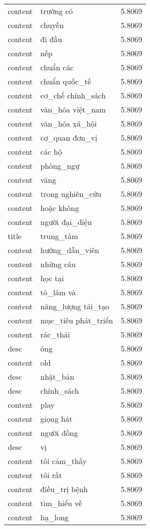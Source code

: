 \documentclass{article}
\begin{document}
\begin{tabular}{lll}
content & trường có & 5.8069\\
content & chuyền & 5.8069\\
content & đi đầu & 5.8069\\
content & nếp & 5.8069\\
content & chuẩn các & 5.8069\\
content & chuẩn quốc\_tế & 5.8069\\
content & cơ\_chế chính\_sách & 5.8069\\
content & văn\_hóa việt\_nam & 5.8069\\
content & văn\_hóa xã\_hội & 5.8069\\
content & cơ\_quan đơn\_vị & 5.8069\\
content & các hộ & 5.8069\\
content & phòng\_ngự & 5.8069\\
content & văng & 5.8069\\
content & trong nghiên\_cứu & 5.8069\\
content & hoặc không & 5.8069\\
content & người đại\_diện & 5.8069\\
title & trung\_tâm & 5.8069\\
content & hướng\_dẫn\_viên & 5.8069\\
content & những câu & 5.8069\\
content & học tại & 5.8069\\
content & tô\_lâm và & 5.8069\\
content & năng\_lượng tái\_tạo & 5.8069\\
content & mục\_tiêu phát\_triển & 5.8069\\
content & rác\_thải & 5.8069\\
desc & ông & 5.8069\\
content & old & 5.8069\\
desc & nhật\_bản & 5.8069\\
desc & chính\_sách & 5.8069\\
content & play & 5.8069\\
content & giọng hát & 5.8069\\
content & người đồng & 5.8069\\
desc & vị & 5.8069\\
content & tôi cảm\_thấy & 5.8069\\
content & tôi rất & 5.8069\\
content & điều\_trị bệnh & 5.8069\\
content & tìm\_hiểu về & 5.8069\\
content & hạ\_long & 5.8069\\

\end{tabular}
\end{document}
